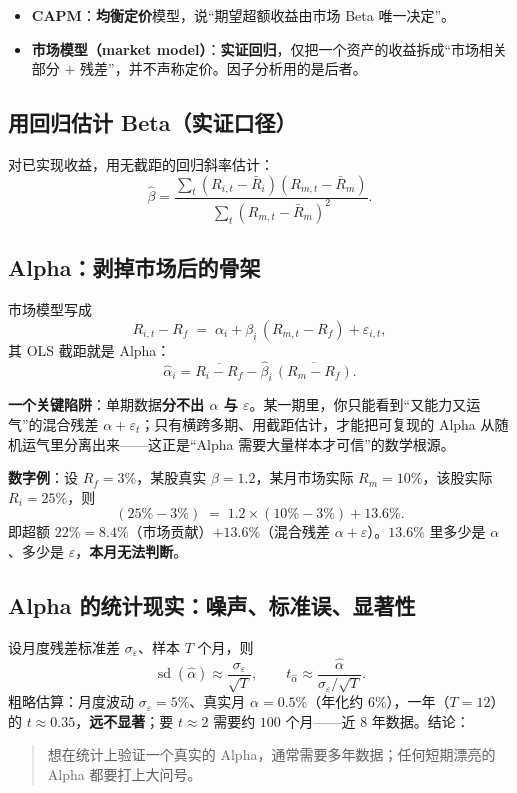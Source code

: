 \documentclass[UTF8,11pt]{ctexart}
\begin{document}
\begin{itemize}[itemsep=2pt]
\item \textbf{CAPM}：\textbf{均衡定价}模型，说“期望超额收益由市场 Beta 唯一决定”。
\item \textbf{市场模型（market model）}：\textbf{实证回归}，仅把一个资产的收益拆成“市场相关部分 $+$ 残差”，并不声称定价。因子分析用的是后者。
\end{itemize}

\subsection{用回归估计 Beta（实证口径）}
对已实现收益，用无截距的回归斜率估计：
\begin{equation}
\hat\beta = \frac{\sum_{t}(R_{i,t}-\bar R_i)(R_{m,t}-\bar R_m)}
                 {\sum_{t}(R_{m,t}-\bar R_m)^2}.
\end{equation}

\subsection{Alpha：剥掉市场后的骨架}
市场模型写成
\begin{equation}
R_{i,t}-R_f \;=\; \alpha_i + \beta_i\,(R_{m,t}-R_f) + \varepsilon_{i,t},
\end{equation}
其 OLS 截距就是 Alpha：
\begin{equation}
\hat\alpha_i = \overline{R_i-R_f} - \hat\beta_i\,\overline{(R_m-R_f)}.
\end{equation}

\textbf{一个关键陷阱}：单期数据\textbf{分不出 $\alpha$ 与 $\varepsilon$}。某一期里，你只能看到“又能力又运气”的混合残差 $\alpha+\varepsilon_t$；只有横跨多期、用截距估计，才能把可复现的 Alpha 从随机运气里分离出来——这正是“Alpha 需要大量样本才可信”的数学根源。

\textbf{数字例}：设 $R_f=3\%$，某股真实 $\beta=1.2$，某月市场实际 $R_m=10\%$，该股实际 $R_i=25\%$，则
\begin{equation}
(25\%-3\%) \;=\; 1.2\times(10\%-3\%) + 13.6\%.
\end{equation}
即超额 $22\% = 8.4\%$（市场贡献）$+13.6\%$（混合残差 $\alpha+\varepsilon$）。$13.6\%$ 里多少是 $\alpha$、多少是 $\varepsilon$，\textbf{本月无法判断}。

\subsection{Alpha 的统计现实：噪声、标准误、显著性}
设月度残差标准差 $\sigma_\varepsilon$、样本 $T$ 个月，则
\begin{equation}
\operatorname{sd}(\hat\alpha)\approx\frac{\sigma_\varepsilon}{\sqrt{T}},
\qquad
t_{\hat\alpha}\approx\frac{\hat\alpha}{\sigma_\varepsilon/\sqrt{T}}.
\end{equation}
粗略估算：月度波动 $\sigma_\varepsilon=5\%$、真实月 $\alpha=0.5\%$（年化约 $6\%$），一年（$T=12$）的 $t\approx 0.35$，\textbf{远不显著}；要 $t\approx 2$ 需要约 $100$ 个月——近 $8$ 年数据。结论：
\begin{quote}
想在统计上验证一个真实的 Alpha，通常需要多年数据；任何短期漂亮的 Alpha 都要打上大问号。
\end{quote}
\end{document}
